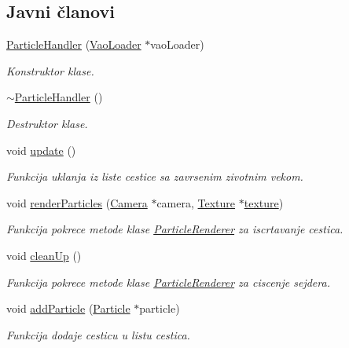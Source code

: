 \subsection*{Javni članovi}
\begin{DoxyCompactItemize}
\item 
\hyperlink{classparticle_1_1ParticleHandler_a20ee0736aeb1a560bd09e83b754aafc1}{Particle\+Handler} (\hyperlink{classcore_1_1VaoLoader}{Vao\+Loader} $\ast$vao\+Loader)
\begin{DoxyCompactList}\small\item\em Konstruktor klase. \end{DoxyCompactList}\item 
\hyperlink{classparticle_1_1ParticleHandler_aeaecb7a63b98e839a0b939c17aff28d3}{$\sim$\+Particle\+Handler} ()
\begin{DoxyCompactList}\small\item\em Destruktor klase. \end{DoxyCompactList}\item 
void \hyperlink{classparticle_1_1ParticleHandler_ac0b409fc65e725cb7fe73534807437a1}{update} ()
\begin{DoxyCompactList}\small\item\em Funkcija uklanja iz liste cestice sa zavrsenim zivotnim vekom. \end{DoxyCompactList}\item 
void \hyperlink{classparticle_1_1ParticleHandler_a171b2f5a6865b688563eb7394bf8371b}{render\+Particles} (\hyperlink{classentity_1_1Camera}{Camera} $\ast$camera, \hyperlink{classtexture_1_1Texture}{Texture} $\ast$\hyperlink{classparticle_1_1ParticleHandler_a918d1b47f645fc24cc36b1a61d2c20ef}{texture})
\begin{DoxyCompactList}\small\item\em Funkcija pokrece metode klase \hyperlink{classparticle_1_1ParticleRenderer}{Particle\+Renderer} za iscrtavanje cestica. \end{DoxyCompactList}\item 
void \hyperlink{classparticle_1_1ParticleHandler_a098ece1e3f68c2d3bdaef95a0781e6eb}{clean\+Up} ()
\begin{DoxyCompactList}\small\item\em Funkcija pokrece metode klase \hyperlink{classparticle_1_1ParticleRenderer}{Particle\+Renderer} za ciscenje sejdera. \end{DoxyCompactList}\item 
void \hyperlink{classparticle_1_1ParticleHandler_a030ab0b73bb572f706fb03c5cfc2fedf}{add\+Particle} (\hyperlink{classparticle_1_1Particle}{Particle} $\ast$particle)
\begin{DoxyCompactList}\small\item\em Funkcija dodaje cesticu u listu cestica. \end{DoxyCompactList}\end{DoxyCompactItemize}
